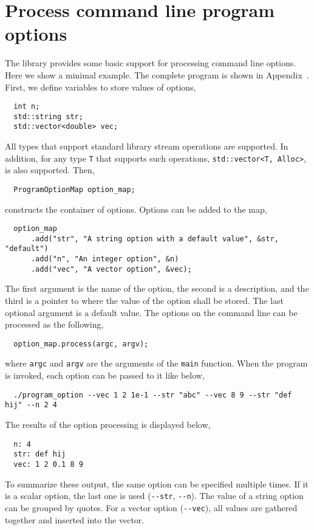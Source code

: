 \section{Process command line program options}
\label{sec:Process command line program options}

The library provides some basic support for processing command line options.
Here we show a minimal example. The complete program is shown in
Appendix~. First, we define
variables to store values of options,
\begin{Verbatim}
  int n;
  std::string str;
  std::vector<double> vec;
\end{Verbatim}
All types that support standard library \io stream operations are supported. In
addition, for any type \verb|T| that supports such operations,
\verb|std::vector<T, Alloc>|, is also supported. Then,
\begin{Verbatim}
  ProgramOptionMap option_map;
\end{Verbatim}
constructs the container of options. Options can be added to the map,
\begin{Verbatim}
  option_map
      .add("str", "A string option with a default value", &str, "default")
      .add("n", "An integer option", &n)
      .add("vec", "A vector option", &vec);
\end{Verbatim}
The first argument is the name of the option, the second is a description, and
the third is a pointer to where the value of the option shall be stored. The
last optional argument is a default value. The options on the command line can
be processed as the following,
\begin{Verbatim}
  option_map.process(argc, argv);
\end{Verbatim}
where \verb|argc| and \verb|argv| are the arguments of the \verb|main|
function. When the program is invoked, each option can be passed to it like
below,
\begin{Verbatim}
  ./program_option --vec 1 2 1e-1 --str "abc" --vec 8 9 --str "def hij" --n 2 4
\end{Verbatim}
The results of the option processing is displayed below,
\begin{Verbatim}
  n: 4
  str: def hij
  vec: 1 2 0.1 8 9
\end{Verbatim}
To summarize these output, the same option can be specified multiple times. If
it is a scalar option, the last one is used (\verb|--str|, \verb|--n|). The
value of a string option can be grouped by quotes. For a vector option
(\verb|--vec|), all values are gathered together and inserted into the vector.

